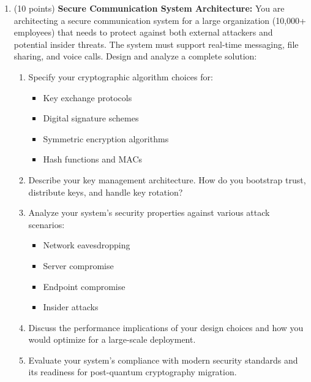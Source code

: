 \documentclass[10pt,a4paper,american]{article}
\begin{document}
\begin{enumerate}
	\item (10 points) \textbf{Secure Communication System Architecture:}
	      You are architecting a secure communication system for a large organization (10,000+ employees) that needs to protect against both external attackers and potential insider threats. The system must support real-time messaging, file sharing, and voice calls.
	      Design and analyze a complete solution:
	      \begin{enumerate}
		      \item Specify your cryptographic algorithm choices for:
		            \begin{itemize}
			            \item Key exchange protocols
			            \item Digital signature schemes
			            \item Symmetric encryption algorithms
			            \item Hash functions and MACs
		            \end{itemize}
		      \item Describe your key management architecture. How do you bootstrap trust, distribute keys, and handle key rotation?
		      \item Analyze your system's security properties against various attack scenarios:
		            \begin{itemize}
			            \item Network eavesdropping
			            \item Server compromise
			            \item Endpoint compromise
			            \item Insider attacks
		            \end{itemize}
		      \item Discuss the performance implications of your design choices and how you would optimize for a large-scale deployment.
		      \item Evaluate your system's compliance with modern security standards and its readiness for post-quantum cryptography migration.
	      \end{enumerate}
\end{enumerate}
\end{document}
